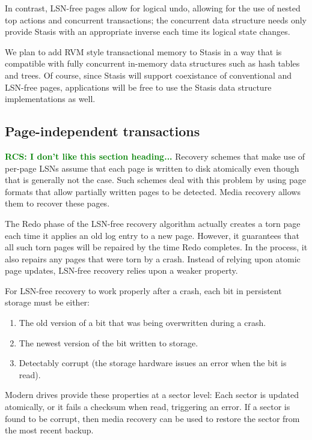 \documentclass[letterpaper,twocolumn,10pt]{article}
\newcommand{\yad}{Stasis\xspace}
\newcommand{\rcs}[1]{\textcolor{green}{\bf RCS: #1}}
\begin{document}
In contrast, LSN-free pages allow for logical
undo, allowing for the use of nested top actions and concurrent
transactions; the concurrent data structure needs only provide \yad
with an appropriate inverse each time its logical state changes.

We plan to add RVM style transactional memory to \yad in a way that is
compatible with fully concurrent in-memory data structures such as
hash tables and trees.  Of course, since \yad will support coexistance
of conventional and LSN-free pages, applications will be free to use
the \yad data structure implementations as well.


\subsection{Page-independent transactions}
\label{sec:torn-page}
\rcs{I don't like this section heading...}  Recovery schemes that make
use of per-page LSNs assume that each page is written to disk
atomically even though that is generally not the case.  Such schemes
deal with this problem by using page formats that allow partially
written pages to be detected.  Media recovery allows them to recover
these pages.  

The Redo phase of the LSN-free recovery algorithm actually creates a
torn page each time it applies an old log entry to a new page.
However, it guarantees that all such torn pages will be repaired by
the time Redo completes.  In the process, it also repairs any pages
that were torn by a crash.  Instead of relying upon atomic page
updates, LSN-free recovery relies upon a weaker property.

For LSN-free recovery to work properly after a crash, each bit in
persistent storage must be either:

\begin{enumerate}
\item The old version of a bit that was being overwritten during a crash.
\item The newest version of the bit written to storage.
\item Detectably corrupt (the storage hardware issues an error when the
  bit is read).
\end{enumerate}

Modern drives provide these properties at a sector level: Each sector
is updated atomically, or it fails a checksum when read, triggering an
error.  If a sector is found to be corrupt, then media recovery can be
used to restore the sector from the most recent backup.
\end{document}
